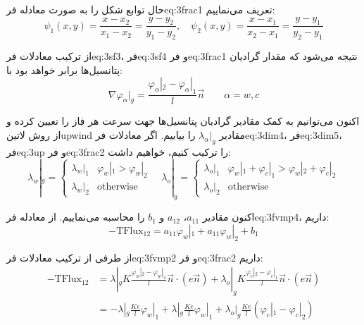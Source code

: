 حال توابع شکل را به صورت معادله ‌فر{eq:3frac1} تعریف می‌نماییم:
\begin{equation}
\label{eq:3frac1}
 \psi_1(x,y) = \frac{x-x_2}{x_1-x_2} = \frac{y-y_2}{y_1-y_2}, \quad
 \psi_2(x,y) =\frac{x-x_1}{x_2-x_1} = \frac{y-y_1}{y_2-y_1}
\end{equation}

از ترکیب معادلات ‌فر{eq:3sf3}،  ‌فر{eq:3sf4} و ‌فر{eq:3frac1}  نتیجه می‌شود که مقدار گرادیان پتانسیل‌ها برابر خواهد بود با:
\begin{equation}
\label{eq:3frac2}
\nabla \varphi_\alpha|_g = 
\frac{\varphi_\alpha|_2 - \varphi_\alpha|_1}{l} \vec{n} 
\qquad \alpha = w,c
\end{equation}

اکنون می‌توانیم به کمک مقادیر گرادیان پتانسیل‌ها جهت سرعت هر فاز را تعیین کرده و از روش ‌لاتین{upwind} مقادیر
$\lambda_\alpha|_g$
را بیابیم. اگر معادلات ‌فر{eq:3dim4}، ‌فر{eq:3dim5}، ‌فر{eq:3up} و ‌فر{eq:3frac2}  را ترکیب کنیم، خواهیم داشت:
\begin{equation}
\label{eq:3frac3}
\lambda_w|_g = 
\begin{cases}
\lambda_w|_1 & \varphi_w|_1 > \varphi_w|_2 \\
\lambda_w|_2 & \text{otherwise}
\end{cases}
\quad 
\lambda_o|_g = 
\begin{cases}
\lambda_o|_1 & \varphi_w|_1 + \varphi_c|_1 > \varphi_w|_2 + \varphi_c|_2 \\
\lambda_o|_2 & \text{otherwise}
\end{cases}
\end{equation}

اکنون مقادیر 
$a_{11}$، $a_{12}$ و $b_1$
را محاسبه می‌نماییم. از معادله ‌فر{eq:3fvmp4}، داریم:
\begin{equation}
\label{eq:3frac4}
-\text{TFlux}_{12} = a_{11}\varphi_w|_1 + a_{11}\varphi_w|_2 + b_1
\end{equation}

از طرفی از ترکیب معادلات ‌فر{eq:3fvmp2} و ‌فر{eq:3frac2} داریم:
\begin{equation}
\label{eq:3frac5}
\begin{aligned}
-\text{TFlux}_{12} 
&= \lambda|_g K \frac{\varphi_w|_2 - \varphi_w|_1}{l} \vec{n} \cdot (e\vec n) +
\lambda_o|_g K \frac{\varphi_c|_2 - \varphi_c|_1}{l} \vec{n} \cdot (e\vec n) \\
&= -\lambda|_g\frac{Ke}{l}\varphi_w|_1 + \lambda|_g\frac{Ke}{l}\varphi_w|_1
+ \lambda_o|_g \frac{Ke}{l}(\varphi_c|_1 - \varphi_c|_2)
\end{aligned}
\end{equation}

